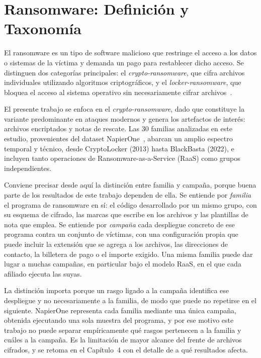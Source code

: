 \section{Ransomware: Definición y Taxonomía}

El ransomware es un tipo de software malicioso que restringe el acceso a los datos o sistemas de la víctima y demanda un pago para restablecer dicho acceso. Se distinguen dos categorías principales: el \textit{crypto-ransomware}, que cifra archivos individuales utilizando algoritmos criptográficos, y el \textit{locker-ransomware}, que bloquea el acceso al sistema operativo sin necesariamente cifrar archivos~\cite{europol2023}.

El presente trabajo se enfoca en el \textit{crypto-ransomware}, dado que constituye la variante predominante en ataques modernos y genera los artefactos de interés: archivos encriptados y notas de rescate. Las 30 familias analizadas en este estudio, provenientes del dataset NapierOne~\cite{paper_7_napierone}, abarcan un amplio espectro temporal y técnico, desde CryptoLocker (2013) hasta BlackBasta (2022), e incluyen tanto operaciones de Ransomware-as-a-Service (RaaS) como grupos independientes.

Conviene precisar desde aquí la distinción entre familia y campaña, porque buena parte de los resultados de este trabajo dependen de ella. Se entiende por \textit{familia} el programa de ransomware en sí: el código desarrollado por un mismo grupo, con su esquema de cifrado, las marcas que escribe en los archivos y las plantillas de nota que emplea. Se entiende por \textit{campaña} cada despliegue concreto de ese programa contra un conjunto de víctimas, con una configuración propia que puede incluir la extensión que se agrega a los archivos, las direcciones de contacto, la billetera de pago o el importe exigido. Una misma familia puede dar lugar a muchas campañas, en particular bajo el modelo RaaS, en el que cada afiliado ejecuta las suyas.

La distinción importa porque un rasgo ligado a la campaña identifica ese despliegue y no necesariamente a la familia, de modo que puede no repetirse en el siguiente. NapierOne representa cada familia mediante una única campaña, obtenida ejecutando una sola muestra del programa, y por ese motivo este trabajo no puede separar empíricamente qué rasgos pertenecen a la familia y cuáles a la campaña. Es la limitación de mayor alcance del frente de archivos cifrados, y se retoma en el Capítulo~4 con el detalle de a qué resultados afecta.

